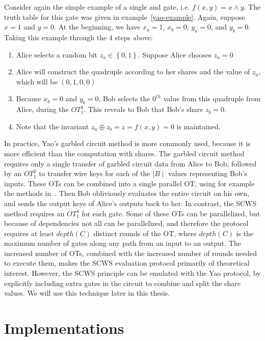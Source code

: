 \begin{example} 
Consider again the simple example of a single and gate, i.e.
$f(x,y)=x \wedge y$.  The truth table for this gate was given
in example~\ref{yao-example}.  Again, suppose $x=1$ and $y=0$.
At the beginning, we have $x_{a}=1$, $x_{b}=0$, $y_{a}=0$, and $y_{b}=0$.
Taking this example through the 4 steps above:
\begin{enumerate}
\item Alice selects a random bit $z_{a}\in\left\{ 0,1\right\} $.  Suppose
Alice chooses $z_{a}=0$
\item Alice will construct the quadruple according to her shares and
the value of $z_{a}$, which will be $\left(0,1,0,0\right)$
\item Because  $x_{b}=0$ and $y_{b}=0$,  Bob selects the $0^{th}$ value from
this quadruple from Alice, during the $OT_{1}^{4}$.  This reveals to
Bob that Bob's share $z_{b}=0$.
\item Note that the invariant $z_{a} \oplus z_{b}=z=f(x,y)=0$ is maintained.
\end{enumerate}

\end{example} 

In practice, Yao's garbled circuit method is more commonly used, because
it is more efficient than the computation with shares. The garbled
circuit method requires only a single transfer of garbled circuit
data from Alice
to Bob, followed by an $OT_{1}^{2}$ to transfer wire keys for each of the 
$\mid B\mid $ values representing
Bob's inputs. These OTs can be combined into a single parallel OT,
using for example the methods in~\cite{naor99otope}.
Then Bob obliviously evaluates the entire circuit on his own, and
sends the output keys of Alice's outputs back to her. In contrast,
the SCWS method requires an $OT_{1}^{4}$ for each gate. Some of these
OTs can be parallelized, but because of dependencies not all can be
parallelized, and therefore the protocol requires at least $depth(C)$
distinct rounds of the OT, where $depth(C)$ is the maximum number
of gates along any path from an input to an output. The increased
number of OTs, combined with the increased number of rounds needed
to execute them, makes the SCWS evaluation protocol primarily of theoretical
interest. However, the SCWS principle can be emulated with the Yao
protocol, by explicitly including extra gates in the circuit to combine
and split the share values. We will use this technique later in this
thesis.


\section{Implementations}

